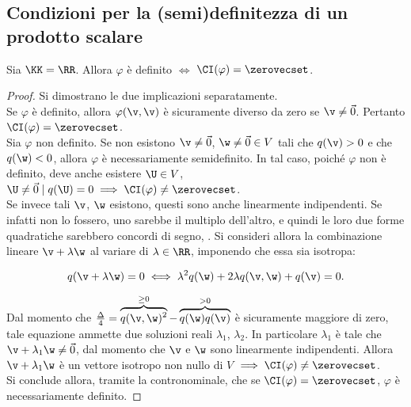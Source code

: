 \subsection{Condizioni per la (semi)definitezza di un prodotto scalare}

\begin{proposition} Sia $\KK = \RR$. Allora
	$\varphi$ è definito $\iff$ $\CI(\varphi) = \zerovecset$. \label{prop:definitezza_varphi}
\end{proposition}

\begin{proof}
	Si dimostrano le due implicazioni separatamente. \\
	
	\rightproof Se $\varphi$ è definito, allora $\varphi(\v, \v)$ è sicuramente diverso da zero
	se $\v \neq \vec 0$. Pertanto $\CI(\varphi) = \zerovecset$. \\
	
	\leftproof Sia $\varphi$ non definito. Se non esistono $\v \neq \vec 0$, $\w \neq \vec 0 \in V$ tali che
	$q(\v) > 0$ e che $q(\w) < 0$, allora $\varphi$ è necessariamente semidefinito. In tal caso,
	poiché $\varphi$ non è definito, deve anche esistere $\U \in V$, $\U \neq \vec 0 \mid q(\U) = 0 \implies \CI(\varphi) \neq \zerovecset$. \\
	
	Se invece tali $\v$, $\w$ esistono, questi sono anche linearmente indipendenti. Se infatti
	non lo fossero, uno sarebbe il multiplo dell'altro, e quindi le loro due forme quadratiche
	sarebbero concordi di segno, \Lightning. Si consideri allora la combinazione lineare
	$\v + \lambda \w$ al variare di $\lambda \in \RR$, imponendo che essa sia isotropa:
	
	\[ q(\v + \lambda \w) = 0 \iff \lambda^2 q(\w)+ 2 \lambda q(\v, \w) + q(\v) = 0. \]
	
	\vskip 0.05in
	
	Dal momento che $\frac{\Delta}{4} = \overbrace{q(\v, \w)^2}^{\geq 0} - \overbrace{q(\w)q(\v)}^{> 0}$ è
	sicuramente maggiore di zero, tale equazione ammette due soluzioni reali $\lambda_1$, $\lambda_2$.
	In particolare $\lambda_1$ è tale che $\v + \lambda_1 \w \neq \vec 0$, dal momento che $\v$ e $\w$
	sono linearmente indipendenti. Allora $\v + \lambda_1 \w$ è un vettore isotropo non nullo
	di $V$ $\implies \CI(\varphi) \neq \zerovecset$. \\
	
	Si conclude allora, tramite la contronominale, che se $\CI(\varphi) = \zerovecset$, $\varphi$
	è necessariamente definito. 
\end{proof}

